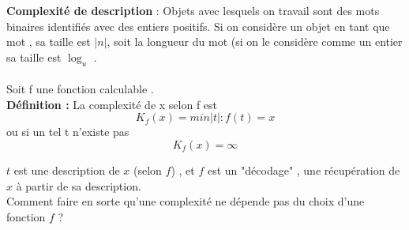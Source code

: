 \documentclass[base.tex]{subfiles}
\begin{document}
\textbf{Complexité de description} : Objets avec lesquels on travail sont des mots binaires identifiés avec des entiers positifs. Si on considère un objet en tant que mot , sa taille est $|n|$, soit la longueur du mot (si on le considère comme un entier sa taille est $\log_u$ .\\
\\
Soit f une fonction calculable .\\
\textbf{Définition : } La complexité de x selon f est
\[K_f(x) = min|t| : f(t) = x\]
ou si un tel t n'existe pas 
\[K_f(x) = \infty\]

$t$ est une description de $x$ (selon $f$) , et $f$ est un "décodage" , une récupération de $x$ à partir de sa description. \\
Comment faire en sorte qu'une complexité ne dépende pas du choix d'une fonction $f$ ?\\
\\
\end{document}
